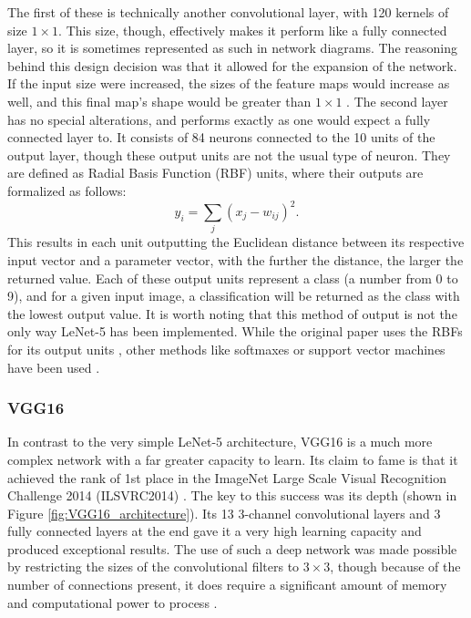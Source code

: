 \documentclass[11pt,a4paper,oldfontcommands]{memoir}
\begin{document}
The first of these is technically another convolutional layer, with 120 kernels of size $1 \times 1$. This size, though, effectively makes it perform like a fully connected layer, so it is sometimes represented as such in network diagrams. The reasoning behind this design decision was that it allowed for the expansion of the network. If the input size were increased, the sizes of the feature maps would increase as well, and this final map's shape would be greater than $1 \times 1$ \cite{lenet5}. The second layer has no special alterations, and performs exactly as one would expect a fully connected layer to. It consists of 84 neurons connected to the 10 units of the output layer, though these output units are not the usual type of neuron. They are defined as Radial Basis Function (RBF) units, where their outputs are formalized as follows:
\begin{equation}
    y_i = \sum\limits_j(x_j - w_{ij})^2 .
\end{equation}
This results in each unit outputting the Euclidean distance between its respective input vector and a parameter vector, with the further the distance, the larger the returned value. Each of these output units represent a class (a number from 0 to 9), and for a given input image, a classification will be returned as the class with the lowest output value. It is worth noting that this method of output is not the only way LeNet-5 has been implemented. While the original paper uses the RBFs for its output units \cite{lenet5}, other methods like softmaxes or support vector machines have been used \cite{ternary}.

\subsubsection{VGG16}
In contrast to the very simple LeNet-5 architecture, VGG16 \cite{vgg16} is a much more complex network with a far greater capacity to learn. Its claim to fame is that it achieved the rank of 1st place in the ImageNet Large Scale Visual Recognition Challenge 2014 (ILSVRC2014) \cite{VGG16_challenge}. The key to this success was its depth (shown in Figure \ref{fig:VGG16_architecture}). Its 13 3-channel convolutional layers and 3 fully connected layers at the end gave it a very high learning capacity and produced exceptional results. The use of such a deep network was made possible by restricting the sizes of the convolutional filters to $3 \times 3$, though because of the number of connections present, it does require a significant amount of memory and computational power to process \cite{binary}.
\end{document}
